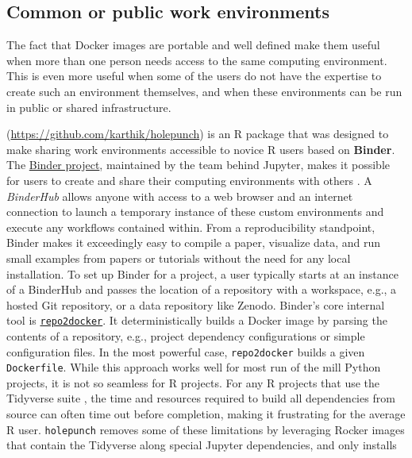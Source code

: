 \hypertarget{common-or-public-work-environments}{%
\subsection{Common or public work
environments}\label{common-or-public-work-environments}}

The fact that Docker images are portable and well defined make them
useful when more than one person needs access to the same computing
environment. This is even more useful when some of the users do not have
the expertise to create such an environment themselves, and when these
environments can be run in public or shared infrastructure.

\textbf{} (\url{https://github.com/karthik/holepunch}) is
an R package that was designed to make sharing work environments
accessible to novice R users based on \textbf{Binder}. The
\href{https://mybinder.readthedocs.io/en/latest/}{Binder project},
maintained by the team behind Jupyter, makes it possible for users to
create and share their computing environments with others
\citep{jupyter_binder_2018}. A \emph{BinderHub} allows anyone with
access to a web browser and an internet connection to launch a temporary
instance of these custom environments and execute any workflows
contained within. From a reproducibility standpoint, Binder makes it
exceedingly easy to compile a paper, visualize data, and run small
examples from papers or tutorials without the need for any local
installation. To set up Binder for a project, a user typically starts at
an instance of a BinderHub and passes the location of a repository with
a workspace, e.g., a hosted Git repository, or a data repository like
Zenodo. Binder's core internal tool is
\href{https://repo2docker.readthedocs.io/en/latest/config_files.html}{\texttt{repo2docker}}.
It deterministically builds a Docker image by parsing the contents of a
repository, e.g., project dependency configurations or simple
configuration files. In the most powerful case, \texttt{repo2docker}
builds a given \texttt{Dockerfile}. While this approach works well for
most run of the mill Python projects, it is not so seamless for R
projects. For any R projects that use the Tidyverse suite
\citep{wickham_welcome_2019}, the time and resources required to build
all dependencies from source can often time out before completion,
making it frustrating for the average R user. \texttt{holepunch} removes
some of these limitations by leveraging Rocker images that contain the
Tidyverse along special Jupyter dependencies, and only installs
